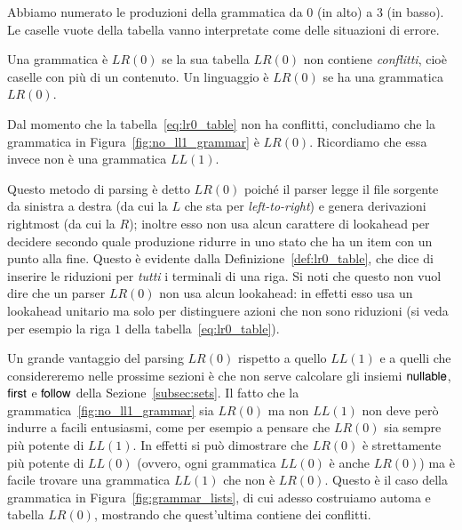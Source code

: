 Abbiamo numerato le produzioni della grammatica da $0$ (in alto)
a $3$ (in basso). Le caselle vuote della tabella vanno interpretate come delle
situazioni di errore.
%
\begin{definition}\label{def:lr0_grammar}
Una grammatica \`e $\mathit{LR}(0)$ se la sua tabella $\mathit{LR}(0)$
non contiene
\emph{conflitti},
cio\`e caselle con pi\`u di un contenuto. Un linguaggio \`e $\mathit{LR}(0)$ se
ha una grammatica $\mathit{LR}(0)$.
\end{definition}
%
\noindent
Dal momento che la tabella~\eqref{eq:lr0_table} non ha conflitti, concludiamo
che la grammatica in Figura~\ref{fig:no_ll1_grammar} \`e $\mathit{LR}(0)$.
Ricordiamo che essa invece non \`e una grammatica $\mathit{LL}(1)$.

Questo metodo di parsing \`e detto $\mathit{LR}(0)$ poich\'e il parser
legge il file sorgente da sinistra a destra (da cui la
$L$ che sta per \emph{left-to-right}) e genera derivazioni rightmost (da cui la
$R$); inoltre esso non usa alcun carattere di lookahead per decidere
secondo quale produzione ridurre in uno stato che ha un item
con un punto alla fine. Questo \`e evidente dalla
Definizione~\ref{def:lr0_table}, che dice di inserire le riduzioni
per \emph{tutti} i terminali di una riga. Si noti che questo non vuol
dire che un parser $\mathit{LR}(0)$ non usa alcun lookahead: in effetti esso
usa un lookahead unitario ma solo per distinguere azioni che non
sono riduzioni (si veda per esempio la riga $1$ della
tabella~\eqref{eq:lr0_table}).

Un grande vantaggio del parsing $\mathit{LR}(0)$ rispetto a quello
$\mathit{LL}(1)$
e a quelli che considereremo nelle prossime sezioni \`e che non serve calcolare
gli insiemi $\mathsf{nullable}$, $\mathsf{first}$ e $\mathsf{follow}$ della Sezione~\ref{subsec:sets}.
Il fatto che la grammatica~\ref{fig:no_ll1_grammar} sia $\mathit{LR}(0)$ ma non
$\mathit{LL}(1)$ non deve per\`o indurre a facili entusiasmi,
come per esempio a pensare che $\mathit{LR}(0)$ sia sempre pi\`u potente
di $\mathit{LL}(1)$. In effetti si pu\`o dimostrare che $\mathit{LR}(0)$
\`e strettamente
pi\`u potente di $\mathit{LL}(0)$ (ovvero, ogni grammatica $\mathit{LL}(0)$
\`e anche
$\mathit{LR}(0)$) ma \`e facile trovare una grammatica $\mathit{LL}(1)$ che
non \`e $\mathit{LR}(0)$.
Questo \`e il caso della grammatica in Figura~\ref{fig:grammar_lists},
di cui adesso costruiamo automa e tabella $\mathit{LR}(0)$, mostrando
che quest'ultima contiene dei conflitti.

